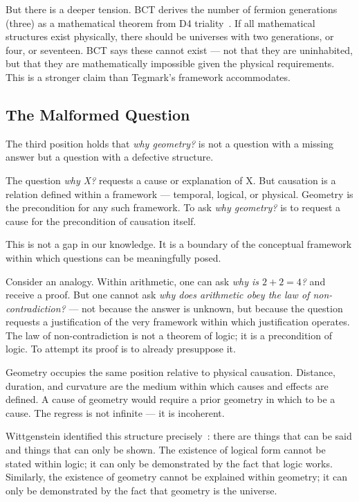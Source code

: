 \documentclass[aps,prl,twocolumn,superscriptaddress,floatfix]{revtex4-2}
\begin{document}
But there is a deeper tension. BCT derives the number of fermion 
generations (three) as a mathematical theorem from D4 triality~\cite{BCT_L18}. 
If all mathematical structures exist physically, there should be 
universes with two generations, or four, or seventeen. BCT says 
these cannot exist --- not that they are uninhabited, but that 
they are mathematically impossible given the physical requirements. 
This is a stronger claim than Tegmark's framework accommodates.

\subsection{The Malformed Question}

The third position holds that \emph{why geometry?} is not a question 
with a missing answer but a question with a defective structure.

The question \emph{why X?} requests a cause or explanation of X. But 
causation is a relation defined within a framework --- temporal, 
logical, or physical. Geometry is the precondition for any such 
framework. To ask \emph{why geometry?} is to request a cause for 
the precondition of causation itself.

This is not a gap in our knowledge. It is a boundary of the 
conceptual framework within which questions can be meaningfully posed.

Consider an analogy. Within arithmetic, one can ask \emph{why is 
$2 + 2 = 4$?} and receive a proof. But one cannot ask \emph{why does 
arithmetic obey the law of non-contradiction?} --- not because the 
answer is unknown, but because the question requests a justification 
of the very framework within which justification operates. The law 
of non-contradiction is not a theorem of logic; it is a precondition 
of logic. To attempt its proof is to already presuppose it.

Geometry occupies the same position relative to physical causation. 
Distance, duration, and curvature are the medium within which 
causes and effects are defined. A cause of geometry would require 
a prior geometry in which to be a cause. The regress is not 
infinite --- it is incoherent.

Wittgenstein identified this structure precisely~\cite{Wittgenstein1921}: 
there are things that can be said and things that can only be shown. 
The existence of logical form cannot be stated within logic; it can 
only be demonstrated by the fact that logic works. Similarly, the 
existence of geometry cannot be explained within geometry; it can 
only be demonstrated by the fact that geometry is the universe.
\end{document}
